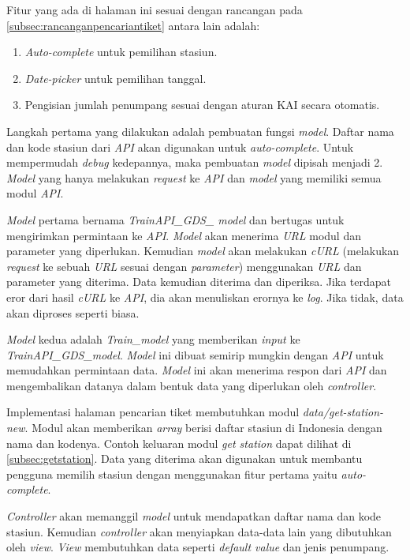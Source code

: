  Fitur yang ada di halaman ini sesuai dengan rancangan pada \ref{subsec:rancanganpencariantiket} antara lain adalah:
 
 \begin{enumerate}
     \item \textit{Auto-complete} untuk pemilihan stasiun.
     \item \textit{Date-picker} untuk pemilihan tanggal.
     \item Pengisian jumlah penumpang sesuai dengan aturan KAI secara otomatis.
 \end{enumerate}

Langkah pertama yang dilakukan adalah pembuatan fungsi \textit{model}. Daftar nama dan kode stasiun dari \textit{API} akan digunakan untuk \textit{auto-complete}. Untuk mempermudah \textit{debug} kedepannya, maka pembuatan \textit{model} dipisah menjadi 2. \textit{Model} yang hanya melakukan \textit{request} ke \textit{API} dan \textit{model} yang memiliki semua modul \textit{API}.

\textit{Model} pertama bernama \textit{TrainAPI\_GDS\_ model} dan bertugas untuk mengirimkan permintaan ke \textit{API}. \textit{Model} akan menerima \textit{URL} modul dan parameter yang diperlukan. Kemudian \textit{model} akan melakukan \textit{cURL} (melakukan \textit{request} ke sebuah \textit{URL} sesuai dengan \textit{parameter}) menggunakan \textit{URL} dan parameter yang diterima. Data kemudian diterima dan diperiksa. Jika terdapat eror dari hasil \textit{cURL} ke \textit{API}, dia akan menuliskan erornya ke \textit{log}. Jika tidak, data akan diproses seperti biasa.

\textit{Model} kedua adalah \textit{Train\_model} yang memberikan \textit{input} ke \textit{TrainAPI\_GDS\_model}. \textit{Model} ini dibuat semirip mungkin dengan \textit{API} untuk memudahkan permintaan data. \textit{Model} ini akan menerima respon dari \textit{API} dan mengembalikan datanya dalam bentuk data yang diperlukan oleh \textit{controller}.

Implementasi halaman pencarian tiket membutuhkan modul \textit{data/get-station-new}. Modul akan memberikan \textit{array} berisi daftar stasiun di Indonesia dengan nama dan kodenya. Contoh keluaran modul \textit{get station} dapat dilihat di \ref{subsec:getstation}. Data yang diterima akan digunakan untuk membantu pengguna memilih stasiun dengan menggunakan fitur pertama yaitu \textit{auto-complete}.

\textit{Controller} akan memanggil \textit{model} untuk mendapatkan daftar nama dan kode stasiun. Kemudian \textit{controller} akan menyiapkan data-data lain yang dibutuhkan oleh \textit{view}. \textit{View} membutuhkan data seperti \textit{default value} dan jenis penumpang.

